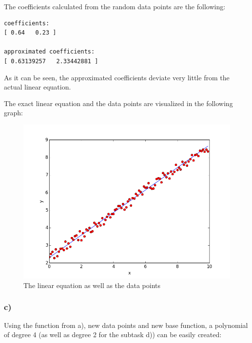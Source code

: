 The coefficients calculated from the random data points are the following:

\begin{lstlisting}[caption=Result of 5.10 b), keywordstyle=\color{black}]
coefficients:
[ 0.64   0.23 ]

approximated coefficients:
[ 0.63139257   2.33442881 ]
\end{lstlisting}

As it can be seen, the approximated coefficients deviate very little from the actual linear equation.

The exact linear equation and the data points are visualized in the following graph:

\newpage

\begin{figure}[!ht]
\includegraphics[width=1\textwidth]{chapters/images/figure-5-10-b}
\caption{The linear equation as well as the data points}
\end{figure}


\subsubsection{c)}

Using the function from a), new data points and new base function, a polynomial of degree 4 (as well as degree 2 for the subtask d)) can be easily created:

